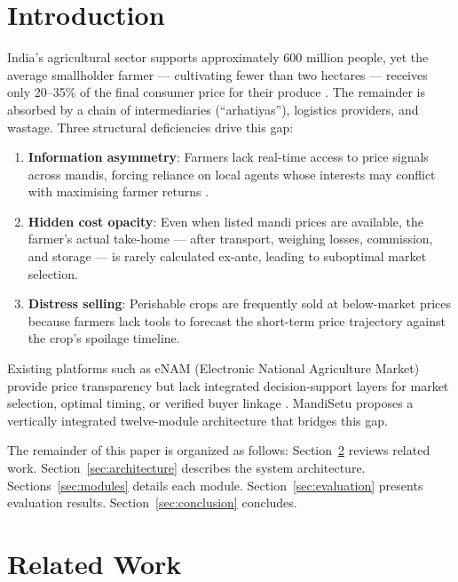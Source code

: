 \documentclass[conference]{IEEEtran}
\begin{document}
\section{Introduction}

India's agricultural sector supports approximately 600 million people, yet the average smallholder farmer — cultivating fewer than two hectares — receives only 20–35\% of the final consumer price for their produce \cite{niti2018}. The remainder is absorbed by a chain of intermediaries (``arhatiyas''), logistics providers, and wastage. Three structural deficiencies drive this gap:

\begin{enumerate}
\item \textbf{Information asymmetry}: Farmers lack real-time access to price signals across mandis, forcing reliance on local agents whose interests may conflict with maximising farmer returns \cite{goyal2010}.
\item \textbf{Hidden cost opacity}: Even when listed mandi prices are available, the farmer's actual take-home — after transport, weighing losses, commission, and storage — is rarely calculated ex-ante, leading to suboptimal market selection.
\item \textbf{Distress selling}: Perishable crops are frequently sold at below-market prices because farmers lack tools to forecast the short-term price trajectory against the crop's spoilage timeline.
\end{enumerate}

Existing platforms such as eNAM (Electronic National Agriculture Market) provide price transparency but lack integrated decision-support layers for market selection, optimal timing, or verified buyer linkage \cite{enam2016}. MandiSetu proposes a vertically integrated twelve-module architecture that bridges this gap.

The remainder of this paper is organized as follows: Section~\ref{sec:related} reviews related work. Section~\ref{sec:architecture} describes the system architecture. Sections~\ref{sec:modules} details each module. Section~\ref{sec:evaluation} presents evaluation results. Section~\ref{sec:conclusion} concludes.

\section{Related Work}
\label{sec:related}
\end{document}
